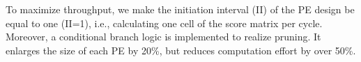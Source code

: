 To maximize throughput, we make the initiation interval (II) of the PE design be equal to one (II=1), i.e., calculating one cell of the score matrix per cycle. 
Moreover, a conditional branch logic is implemented to realize pruning. 
It enlarges the size of each PE by 20\%, but reduces computation effort by over 50\%.  
